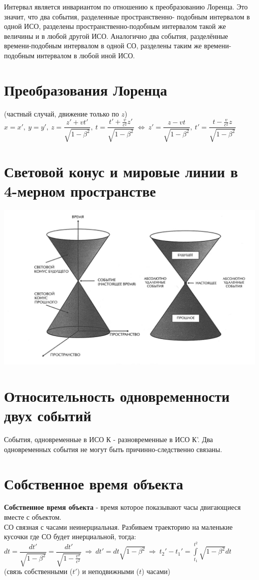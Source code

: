 \begin{multicols*}{2}
		Интервал является инвариантом по отношению к преобразованию Лоренца. Это значит, что два события, разделенные пространственно- подобным интервалом в одной ИСО, разделены пространственно-подобным интервалом такой же величины и в любой другой ИСО. Аналогично два события, разделённые времени-подобным интервалом в одной СО, разделены таким же времени-подобным интервалом в любой иной ИСО.
		
		\section{Преобразования Лоренца}
		
		(частный случай, движение только по $ z $) \\ 
		$ x=x',~ y=y',~ z=\dfrac{z'+vt'}{\sqrt{1-\beta^2}},~ t=\dfrac{t'+\frac{v}{c^2}z'}{\sqrt{1-\beta^2}}~\Leftrightarrow~ z'=\dfrac{z-vt}{\sqrt{1-\beta^2}},~ t'=\dfrac{t-\frac{v}{c^2}z}{\sqrt{1-\beta^2}} $
		
		\section{Световой конус и мировые линии в 4-мерном пространстве}
		\includegraphics[width=0.6\linewidth]{sto_img/lihgt_konus}
		
		\section{Относительность одновременности двух событий}
		
		События, одновременные в ИСО К - разновременные в ИСО К'. Два одновременных события не могут быть причинно-следственно связаны.
		
		\section{Собственное время объекта}
		
		\textbf{Собственное время объекта} - время которое показывают часы двигающиеся вместе с объектом. \\
		СО  связная с часами неинерциальная. Разбиваем траекторию на маленькие кусочки где СО будет инерциальной, тогда: \\
		$ dt=\dfrac{dt'}{\sqrt{1-\beta^2}} = \dfrac{dt'}{\sqrt{1-\frac{v^2}{c^2}}} ~\Rightarrow~ dt'=dt\sqrt{1-\beta^2} ~\Rightarrow~ t_2'-t_1' = \int\limits_{t_1}^{t^2}\sqrt{1-\beta^2} dt$ \\
		(связь собственными ($ t' $) и неподвижными ($ t  $) часами)
		

\end{multicols*}
